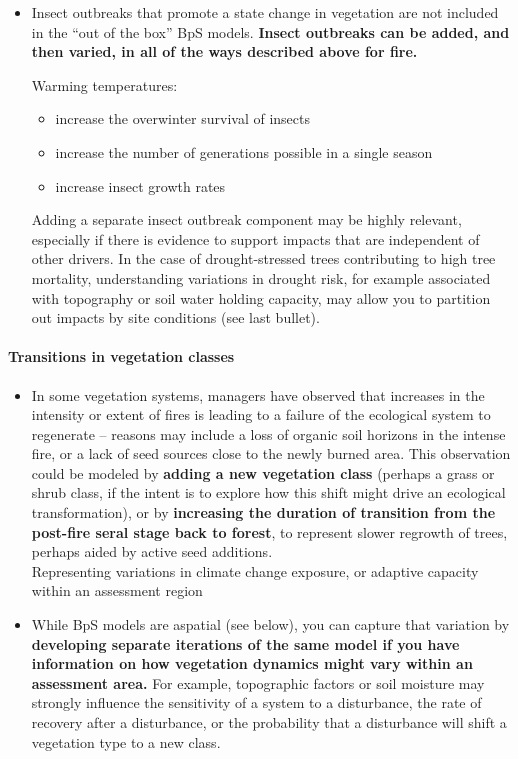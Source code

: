 \documentclass[
]{article}
\providecommand{\tightlist}{%
  \setlength{\itemsep}{0pt}\setlength{\parskip}{0pt}}
\begin{document}
\begin{itemize}
\item
  Insect outbreaks that promote a state change in vegetation are not
  included in the ``out of the box'' BpS models. \textbf{Insect
  outbreaks can be added, and then varied, in all of the ways described
  above for fire.}

  Warming temperatures:

  \begin{itemize}
  \tightlist
  \item
    increase the overwinter survival of insects
  \item
    increase the number of generations possible in a single season
  \item
    increase insect growth rates
  \end{itemize}

  Adding a separate insect outbreak component may be highly relevant,
  especially if there is evidence to support impacts that are
  independent of other drivers. In the case of drought-stressed trees
  contributing to high tree mortality, understanding variations in
  drought risk, for example associated with topography or soil water
  holding capacity, may allow you to partition out impacts by site
  conditions (see last bullet).
\end{itemize}

\hypertarget{transitions-in-vegetation-classes}{%
\paragraph{Transitions in vegetation
classes}\label{transitions-in-vegetation-classes}}

\begin{itemize}
\item
  In some vegetation systems, managers have observed that increases in
  the intensity or extent of fires is leading to a failure of the
  ecological system to regenerate -- reasons may include a loss of
  organic soil horizons in the intense fire, or a lack of seed sources
  close to the newly burned area. This observation could be modeled by
  \textbf{adding a new vegetation class} (perhaps a grass or shrub
  class, if the intent is to explore how this shift might drive an
  ecological transformation), or by \textbf{increasing the duration of
  transition from the post-fire seral stage back to forest}, to
  represent slower regrowth of trees, perhaps aided by active seed
  additions.\\
  Representing variations in climate change exposure, or adaptive
  capacity within an assessment region
\item
  While BpS models are aspatial (see below), you can capture that
  variation by \textbf{developing separate iterations of the same model
  if you have information on how vegetation dynamics might vary within
  an assessment area.} For example, topographic factors or soil moisture
  may strongly influence the sensitivity of a system to a disturbance,
  the rate of recovery after a disturbance, or the probability that a
  disturbance will shift a vegetation type to a new class.
\end{itemize}
\end{document}
